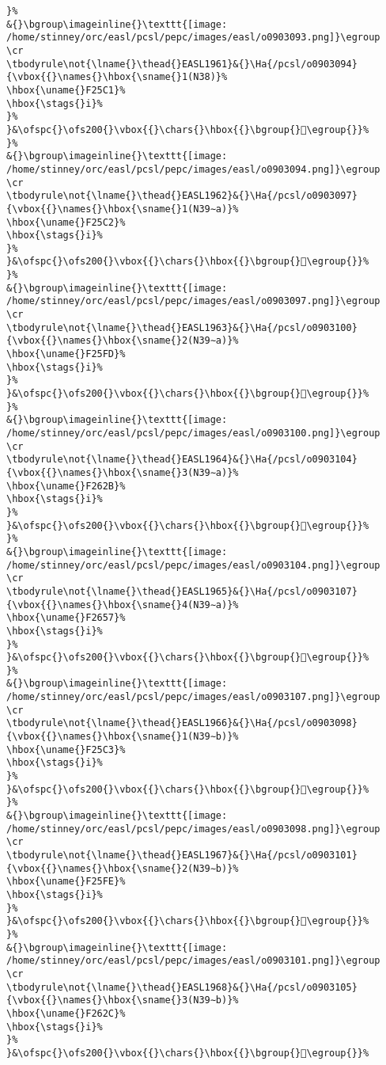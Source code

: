 \begin{verbatim}
}%
&{}\bgroup\imageinline{}\texttt{[image: /home/stinney/orc/easl/pcsl/pepc/images/easl/o0903093.png]}\egroup
\cr
\tbodyrule\not{\lname{}\thead{}EASL1961}&{}\Ha{/pcsl/o0903094}{\vbox{{}\names{}\hbox{\sname{}1(N38)}%
\hbox{\uname{}F25C1}%
\hbox{\stags{}i}%
}%
}&\ofspc{}\ofs200{}\vbox{{}\chars{}\hbox{{}\bgroup{}󲗁\egroup{}}%
}%
&{}\bgroup\imageinline{}\texttt{[image: /home/stinney/orc/easl/pcsl/pepc/images/easl/o0903094.png]}\egroup
\cr
\tbodyrule\not{\lname{}\thead{}EASL1962}&{}\Ha{/pcsl/o0903097}{\vbox{{}\names{}\hbox{\sname{}1(N39∼a)}%
\hbox{\uname{}F25C2}%
\hbox{\stags{}i}%
}%
}&\ofspc{}\ofs200{}\vbox{{}\chars{}\hbox{{}\bgroup{}󲗂\egroup{}}%
}%
&{}\bgroup\imageinline{}\texttt{[image: /home/stinney/orc/easl/pcsl/pepc/images/easl/o0903097.png]}\egroup
\cr
\tbodyrule\not{\lname{}\thead{}EASL1963}&{}\Ha{/pcsl/o0903100}{\vbox{{}\names{}\hbox{\sname{}2(N39∼a)}%
\hbox{\uname{}F25FD}%
\hbox{\stags{}i}%
}%
}&\ofspc{}\ofs200{}\vbox{{}\chars{}\hbox{{}\bgroup{}󲗽\egroup{}}%
}%
&{}\bgroup\imageinline{}\texttt{[image: /home/stinney/orc/easl/pcsl/pepc/images/easl/o0903100.png]}\egroup
\cr
\tbodyrule\not{\lname{}\thead{}EASL1964}&{}\Ha{/pcsl/o0903104}{\vbox{{}\names{}\hbox{\sname{}3(N39∼a)}%
\hbox{\uname{}F262B}%
\hbox{\stags{}i}%
}%
}&\ofspc{}\ofs200{}\vbox{{}\chars{}\hbox{{}\bgroup{}󲘫\egroup{}}%
}%
&{}\bgroup\imageinline{}\texttt{[image: /home/stinney/orc/easl/pcsl/pepc/images/easl/o0903104.png]}\egroup
\cr
\tbodyrule\not{\lname{}\thead{}EASL1965}&{}\Ha{/pcsl/o0903107}{\vbox{{}\names{}\hbox{\sname{}4(N39∼a)}%
\hbox{\uname{}F2657}%
\hbox{\stags{}i}%
}%
}&\ofspc{}\ofs200{}\vbox{{}\chars{}\hbox{{}\bgroup{}󲙗\egroup{}}%
}%
&{}\bgroup\imageinline{}\texttt{[image: /home/stinney/orc/easl/pcsl/pepc/images/easl/o0903107.png]}\egroup
\cr
\tbodyrule\not{\lname{}\thead{}EASL1966}&{}\Ha{/pcsl/o0903098}{\vbox{{}\names{}\hbox{\sname{}1(N39∼b)}%
\hbox{\uname{}F25C3}%
\hbox{\stags{}i}%
}%
}&\ofspc{}\ofs200{}\vbox{{}\chars{}\hbox{{}\bgroup{}󲗃\egroup{}}%
}%
&{}\bgroup\imageinline{}\texttt{[image: /home/stinney/orc/easl/pcsl/pepc/images/easl/o0903098.png]}\egroup
\cr
\tbodyrule\not{\lname{}\thead{}EASL1967}&{}\Ha{/pcsl/o0903101}{\vbox{{}\names{}\hbox{\sname{}2(N39∼b)}%
\hbox{\uname{}F25FE}%
\hbox{\stags{}i}%
}%
}&\ofspc{}\ofs200{}\vbox{{}\chars{}\hbox{{}\bgroup{}󲗾\egroup{}}%
}%
&{}\bgroup\imageinline{}\texttt{[image: /home/stinney/orc/easl/pcsl/pepc/images/easl/o0903101.png]}\egroup
\cr
\tbodyrule\not{\lname{}\thead{}EASL1968}&{}\Ha{/pcsl/o0903105}{\vbox{{}\names{}\hbox{\sname{}3(N39∼b)}%
\hbox{\uname{}F262C}%
\hbox{\stags{}i}%
}%
}&\ofspc{}\ofs200{}\vbox{{}\chars{}\hbox{{}\bgroup{}󲘬\egroup{}}%

\end{verbatim}
